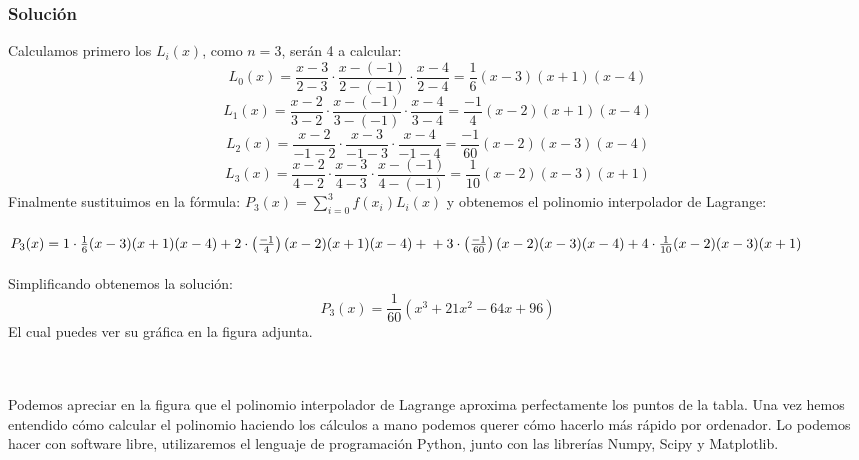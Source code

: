 \documentclass[12pt,a4paper,oneside]{scrbook}
\begin{document}
\subsubsection*{Solución}
Calculamos primero los $L_i(x)$, como $n=3$, serán 4 a calcular:
$$
L_0(x)=\dfrac{x-3}{2-3}\cdot\dfrac{x-(-1)}{2-(-1)}\cdot\dfrac{x-4}{2-4}=\frac{1}{6}(x-3)(x+1)(x-4)$$
$$
L_1(x)=\dfrac{x-2}{3-2}\cdot\dfrac{x-(-1)}{3-(-1)}\cdot\dfrac{x-4}{3-4}=\frac{-1}{4}(x-2)(x+1)(x-4)$$
$$
L_2(x)=\dfrac{x-2}{-1-2}\cdot\dfrac{x-3}{-1-3}\cdot\dfrac{x-4}{-1-4}=\frac{-1}{60}(x-2)(x-3)(x-4)$$
$$
L_3(x)=\dfrac{x-2}{4-2}\cdot\dfrac{x-3}{4-3}\cdot\dfrac{x-(-1)}{4-(-1)}=\frac{1}{10}(x-2)(x-3)(x+1)
$$
Finalmente sustituimos en la fórmula: $P_3(x)=\sum\limits_{i=0}^3 f(x_i)L_i(x)$ y obtenemos el polinomio interpolador de Lagrange:\\ \\
$
P_3(x)=1\cdot\frac{1}{6}(x-3)(x+1)(x-4)+2\cdot\left(\frac{-1}{4}\right)(x-2)(x+1)(x-4)+\\
+3\cdot\left(\frac{-1}{60}\right)(x-2)(x-3)(x-4)+4\cdot\frac{1}{10}(x-2)(x-3)(x+1)
$\\ \\
Simplificando obtenemos la solución:
$$
P_3(x)=\frac{1}{60}\left( x^3+21x^2-64x+96 \right)
$$
El cual puedes ver su gráfica en la figura adjunta.\\ \\
\\
Podemos apreciar en la figura que el polinomio interpolador de Lagrange aproxima perfectamente los puntos de la tabla.
Una vez hemos entendido cómo calcular el polinomio haciendo los cálculos a mano podemos querer cómo hacerlo más rápido por ordenador. Lo podemos hacer con software libre, utilizaremos el lenguaje de programación Python, junto con las librerías Numpy, Scipy y Matplotlib.\\
\end{document}
